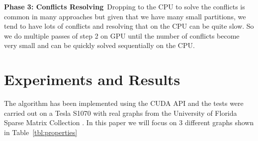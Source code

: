 \documentclass[preprint]{sigplanconf}
\begin{document}
%
%
%


\textbf{Phase 3: Conflicts Resolving}\
Dropping to the CPU to solve the conflicts is common in many approaches but given that we have many small partitions, we tend to have lots of conflicts and resolving that on the CPU can be quite slow. So we do multiple passes of step 2 on GPU until the number of conflicts become very small and can be quickly solved sequentially on the CPU. 


\section{Experiments and Results}
The algorithm has been implemented using the CUDA API and the tests were carried out on a Tesla S1070 with real graphs from the University of Florida Sparse Matrix Collection \cite{uofMatrix}. In this paper we will focus on 3 different graphs shown in Table~\ref{tbl:properties}
\end{document}
